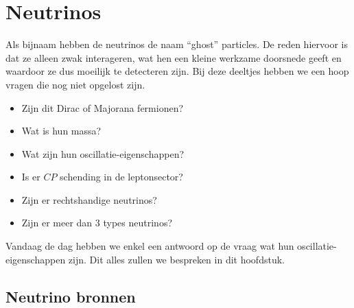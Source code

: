 \documentclass[../main.tex]{subfiles}
\begin{document}
\section{Neutrinos}%
\label{sec:neutrinos}

Als bijnaam hebben de neutrinos de naam ``ghost'' particles. De reden hiervoor is dat ze alleen zwak interageren, wat hen een kleine werkzame doorsnede geeft en waardoor ze dus moeilijk te detecteren zijn. Bij deze deeltjes hebben we een hoop vragen die nog niet opgelost zijn.
\begin{itemize}
    \item Zijn dit Dirac of Majorana fermionen?
    \item Wat is hun massa?
    \item Wat zijn hun oscillatie-eigenschappen?
    \item Is er $CP$ schending in de leptonsector?
    \item Zijn er rechtshandige neutrinos?
    \item Zijn er meer dan 3 types neutrinos?
\end{itemize}
Vandaag de dag hebben we enkel een antwoord op de vraag wat hun oscillatie-eigenschappen zijn. Dit alles zullen we bespreken in dit hoofdstuk.

\subsection{Neutrino bronnen}%
\label{sub:neutrino_bronnen}
\end{document}
